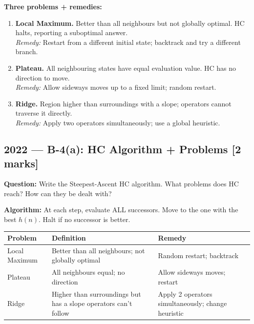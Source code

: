 \documentclass[12pt, a4paper]{article}
\newenvironment{solutionbox}{\begin{mdframed}[style=solutionframe]}{\end{mdframed}}
\begin{document}
\noindent\textbf{Three problems + remedies:}
\begin{enumerate}[leftmargin=1.5cm, itemsep=6pt]
  \item \textbf{Local Maximum.} Better than all neighbours but not globally optimal. HC halts, reporting a suboptimal answer.\\
        \textit{Remedy:} Restart from a different initial state; backtrack and try a different branch.

  \item \textbf{Plateau.} All neighbouring states have equal evaluation value. HC has no direction to move.\\
        \textit{Remedy:} Allow sideways moves up to a fixed limit; random restart.

  \item \textbf{Ridge.} Region higher than surroundings with a slope; operators cannot traverse it directly.\\
        \textit{Remedy:} Apply two operators simultaneously; use a global heuristic.
\end{enumerate}

\subsection{2022 — B-4(a): HC Algorithm + Problems [2 marks]}

\begin{solutionbox}
\textbf{Question:} Write the Steepest-Ascent HC algorithm. What problems does HC reach? How can they be dealt with?
\end{solutionbox}

\noindent\textbf{Algorithm:} At each step, evaluate ALL successors. Move to the one with the best $h(n)$. Halt if no successor is better.

\begin{center}
\renewcommand{\arraystretch}{1.4}
\small
\begin{tabular}{l|p{5.5cm}|p{5.5cm}}
\toprule
\textbf{Problem} & \textbf{Definition} & \textbf{Remedy} \\
\midrule
Local Maximum & Better than all neighbours; not globally optimal & Random restart; backtrack \\
Plateau & All neighbours equal; no direction & Allow sideways moves; restart \\
Ridge & Higher than surroundings but has a slope operators can't follow & Apply 2 operators simultaneously; change heuristic \\
\bottomrule
\end{tabular}
\end{center}
\end{document}
